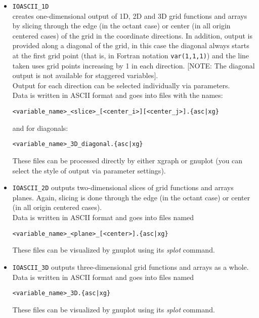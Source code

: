 \documentclass{article}
\begin{document}
\begin{itemize}
  \item {\tt IOASCII\_1D}\\
    creates one-dimensional output of 1D, 2D and
    3D grid functions and arrays by slicing through the edge (in the
    octant case) or center (in all origin centered cases) of the grid in
    the coordinate directions.  In addition, output is provided
    along a diagonal of the grid, in this case the diagonal always starts
    at the first grid point (that is, in Fortran notation {\tt var(1,1,1)})
    and the line taken uses grid points increasing by 1 in each direction.
    [NOTE: The diagonal output is not available for staggered variables].\\
    Output for each direction can be selected individually via parameters.\\
    Data is written in ASCII format and goes into files with the names:
   \begin{center}
    {\tt <variable\_name>\_<slice>\_[<center\_i>][<center\_j>].\{asc|xg\}}
   \end{center}
    and for diagonals:
    \begin{center}{\tt <variable\_name>\_3D\_diagonal.\{asc|xg\}} 
    \end{center}
    These files can be processed directly by either xgraph or gnuplot
    (you can select the style of output via parameter settings).

  \item {\tt IOASCII\_2D}
    outputs two-dimensional slices of grid functions and arrays planes.
    Again, slicing is done through the edge (in the octant case) or center
    (in all origin centered cases).\\
    Data is written in ASCII format and goes into files named
\begin{center}
    {\tt <variable\_name>\_<plane>\_[<center>].\{asc|xg\}}
\end{center}
    These files can be visualized by gnuplot using its {\it splot} command.

  \item {\tt IOASCII\_3D}
    outputs three-dimensional grid functions and arrays as a whole.\\
    Data is written in ASCII format and goes into files named
\begin{center}
    {\tt <variable\_name>\_3D.\{asc|xg\}}
\end{center}
    These files can be visualized by gnuplot using its {\it splot} command.
\end{itemize}
%
%
\end{document}
